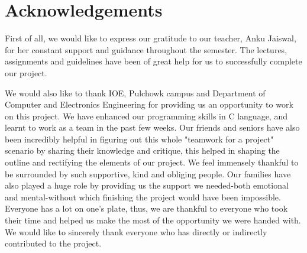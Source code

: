 \documentclass[report]{subfiles}
\begin{document}
\chapter*{\centering Acknowledgements}

First of all, we would like to express our gratitude to our teacher, Anku Jaiswal, for her constant support and guidance throughout the semester.
The lectures, assignments and guidelines have been of great help for us to successfully complete our project.

We would also like to thank IOE, Pulchowk campus and Department of Computer and Electronics Engineering for providing us an opportunity to work on this project.
We have enhanced our programming skills in C language, and learnt to work as a team in the past few weeks. Our friends and seniors have also been incredibly helpful in figuring out this whole "teamwork for a project" scenario by sharing their knowledge and critique, this helped in shaping the outline and rectifying the elements of our project. 
We feel immensely thankful to be surrounded by such supportive, kind and obliging people. Our families have also played a huge role by providing us the support we needed-both emotional and mental-without which finishing the project would have been impossible. Everyone has a lot on one's plate, thus, we are thankful to everyone who took their time and helped us make the most of the opportunity we were handed with.
We would like to sincerely thank everyone who has directly or indirectly contributed to the project. 
\end{document}
